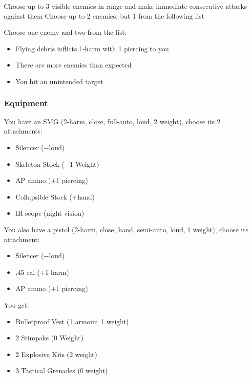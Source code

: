 {Choose up to 3 visible enemies in range and make immediate consecutive attacks against them}
{Choose up to 2 enemies, but 1 from the following list}
{Choose one enemy and two from the list:
\begin{itemize}
\item Flying debris inflicts 1-harm with 1 piercing to you
\item There are more enemies than expected
\item You hit an unintended target
\end{itemize}}

\subsubsection{Equipment}
You have an SMG (2-harm, close, full-auto, loud, 2 weight), choose its 2 attachments:
\begin{itemize}
\item Silencer ($-$loud)
\item Skeleton Stock ($-1$ Weight)
\item AP ammo (+1 piercing)
\item Collapsible Stock (+hand)
\item IR scope (night vision)
\end{itemize}

You also have a pistol (2-harm, close, hand, semi-auto, loud, 1 weight), choose its attachment:
\begin{itemize}
\item Silencer ($-$loud)
\item .45 cal (+1-harm)
\item AP ammo (+1 piercing)
\end{itemize}

You get:
\begin{itemize}
\item Bulletproof Vest (1 armour, 1 weight)
\item 2 Stimpaks (0 Weight)
\item 2 Explosive Kits (2 weight)
\item 3 Tactical Grenades (0 weight)
\end{itemize}


